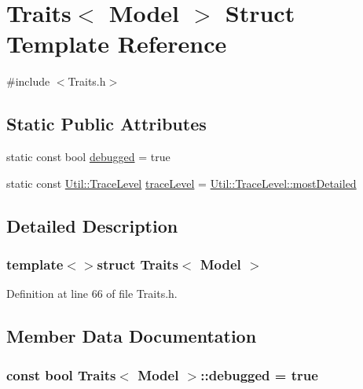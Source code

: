 \hypertarget{struct_traits_3_01_model_01_4}{\section{Traits$<$ Model $>$ Struct Template Reference}
\label{struct_traits_3_01_model_01_4}
}


{\ttfamily \#include $<$Traits.\-h$>$}

\subsection*{Static Public Attributes}
\begin{DoxyCompactItemize}
\item 
static const bool \hyperlink{struct_traits_3_01_model_01_4_a027110f826901a79353bd286be774fe4}{debugged} = true
\item 
static const \hyperlink{class_util_a0a3482cfa2d915e261c0cf528fdc7afc}{Util\-::\-Trace\-Level} \hyperlink{struct_traits_3_01_model_01_4_a2514a0ce35ca8177c4605b4b2266eb05}{trace\-Level} = \hyperlink{class_util_a0a3482cfa2d915e261c0cf528fdc7afcaac18d2ea075dba67f95df9a907eee741}{Util\-::\-Trace\-Level\-::most\-Detailed}
\end{DoxyCompactItemize}


\subsection{Detailed Description}
\subsubsection*{template$<$$>$struct Traits$<$ Model $>$}



Definition at line 66 of file Traits.\-h.



\subsection{Member Data Documentation}
\hypertarget{struct_traits_3_01_model_01_4_a027110f826901a79353bd286be774fe4}{
\subsubsection[{debugged}]{\setlength{\rightskip}{0pt plus 5cm}const bool {\bf Traits}$<$ {\bf Model} $>$\-::debugged = true\hspace{0.3cm}{\ttfamily [static]}}}\label{struct_traits_3_01_model_01_4_a027110f826901a79353bd286be774fe4}


